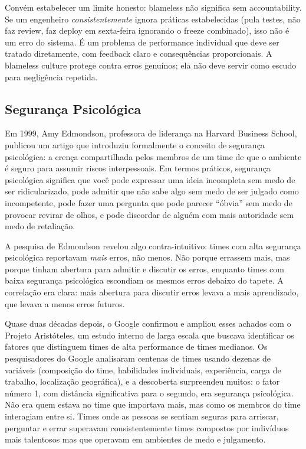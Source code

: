 Convém estabelecer um limite honesto: blameless não significa sem
accountability. Se um engenheiro \textit{consistentemente} ignora práticas
estabelecidas (pula testes, não faz review, faz deploy em sexta-feira
ignorando o freeze combinado), isso não é um erro do sistema. É um
problema de performance individual que deve ser tratado diretamente, com
feedback claro e consequências proporcionais. A blameless culture protege
contra erros genuínos; ela não deve servir como escudo para negligência
repetida.

\subsection{Segurança Psicológica}

Em 1999, Amy Edmondson, professora de liderança na Harvard Business School,
publicou um artigo que introduziu formalmente o conceito de segurança
psicológica: a crença compartilhada pelos membros de um time de que o ambiente
é seguro para assumir riscos interpessoais. Em termos práticos, segurança
psicológica significa que você pode expressar uma ideia incompleta sem medo de
ser ridicularizado, pode admitir que não sabe algo sem medo de ser julgado
como incompetente, pode fazer uma pergunta que pode parecer ``óbvia'' sem
medo de provocar revirar de olhos, e pode discordar de alguém com mais
autoridade sem medo de retaliação.

A pesquisa de Edmondson revelou algo contra-intuitivo: times com alta segurança
psicológica reportavam \textit{mais} erros, não menos. Não porque errassem
mais, mas porque tinham abertura para admitir e discutir os erros, enquanto
times com baixa segurança psicológica escondiam os mesmos erros debaixo do
tapete. A correlação era clara: mais abertura para discutir erros levava a
mais aprendizado, que levava a menos erros futuros.

Quase duas décadas depois, o Google confirmou e ampliou esses achados com o
Projeto Aristóteles, um estudo interno de larga escala que buscava identificar
os fatores que distinguem times de alta performance de times medianos. Os
pesquisadores do Google analisaram centenas de times usando dezenas de
variáveis (composição do time, habilidades individuais, experiência, carga
de trabalho, localização geográfica), e a descoberta surpreendeu muitos: o
fator número 1, com distância significativa para o segundo, era segurança
psicológica. Não era quem estava no time que importava mais, mas como os
membros do time interagiam entre si. Times onde as pessoas se sentiam seguras
para arriscar, perguntar e errar superavam consistentemente times compostos
por indivíduos mais talentosos mas que operavam em ambientes de medo e
julgamento.

